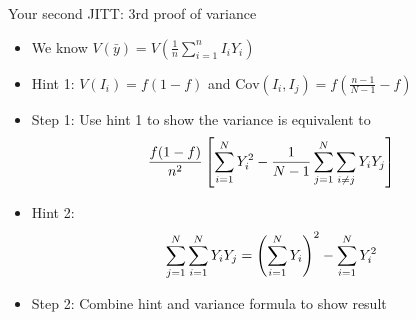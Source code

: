 \documentclass[
  ignorenonframetext,
]{beamer}
\begin{document}
\begin{frame}{Your second JITT: 3rd proof of variance}
\protect\hypertarget{your-second-jitt-3rd-proof-of-variance}{}

\begin{itemize}
\item
  We know
  \(V (\bar y) = V\left( \frac{1}{n} \sum_{i=1}^n I_i Y_i \right)\)
\item
  Hint 1: \(V(I_i) = f (1-f)\) and
  \(\text{Cov}(I_i, I_j) = f \left( \frac{n-1}{N-1} - f \right)\)
\item
  Step 1: Use hint 1 to show the variance is equivalent to \[ \small
  \frac{f (1-f)}{n^2} \left[ \sum_{i=1}^N Y_i^2 - \frac{1}{N-1} \sum_{j=1}^N \sum_{i\neq j} Y_i Y_j\right]
  \]
\item
  Hint 2: \[ \small
  \sum_{j=1}^N \sum_{i=1}^N Y_i Y_j = \left( \sum_{i=1}^N Y_i \right)^2 - \sum_{i=1}^N Y_i^2
  \]
\item
  Step 2: Combine hint and variance formula to show result
\end{itemize}

\end{frame}
\end{document}
